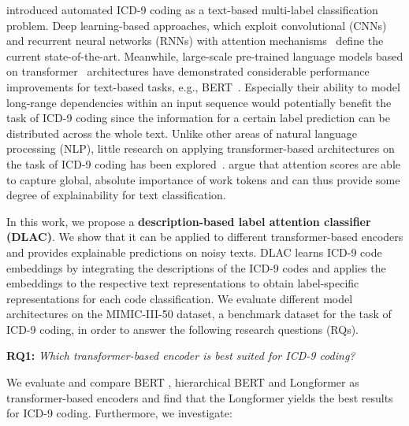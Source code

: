 \documentclass[11pt]{article}
\begin{document}
\citet{de1998hierarchical} introduced automated ICD-9 coding as a text-based multi-label classification problem. %
Deep learning-based approaches, which exploit convolutional (CNNs) and recurrent neural networks (RNNs) with attention mechanisms~\citep{Shi, mullenbach-etal-2018-explainable,Vu} define the current  state-of-the-art. Meanwhile, large-scale pre-trained language models based on transformer~\citep{NIPS2017_3f5ee243} architectures have demonstrated considerable performance improvements for text-based tasks, e.g., BERT~\citep{devlin-etal-2019-bert}. Especially their ability to model long-range dependencies within an input sequence would potentially benefit the task of ICD-9 coding since the information for a certain label prediction can be distributed across the whole text. Unlike other areas of natural language processing (NLP), little research on applying transformer-based architectures on the task of ICD-9 coding has been explored~\citep{pascual-etal-2021-towards,biswas2021transicd,ji2021does}. \citet{sun2020understanding} argue that attention scores are able to capture global, absolute importance of work tokens and can thus provide some degree of explainability for text classification.

In this work, we propose a \textbf{description-based label attention classifier (DLAC)}. We show that it can be applied to different transformer-based encoders and provides explainable predictions on noisy texts.
DLAC learns ICD-9 code embeddings by integrating the descriptions of the ICD-9 codes and applies the embeddings to the respective text representations to obtain label-specific representations for each code classification. We evaluate different model architectures on the MIMIC-III-50 dataset, a benchmark dataset for the task of ICD-9 coding, in order to answer the following research questions (RQs).

\textbf{RQ1:} \textit{Which transformer-based encoder is best suited for ICD-9 coding?}

We evaluate and compare BERT \citep{devlin-etal-2019-bert}, hierarchical BERT \citep{pappagari2019hierarchical} and Longformer \citep{Longformer} as transformer-based encoders and find that the Longformer \citep{Longformer} yields the best results for ICD-9 coding.
Furthermore, we investigate:
\end{document}
